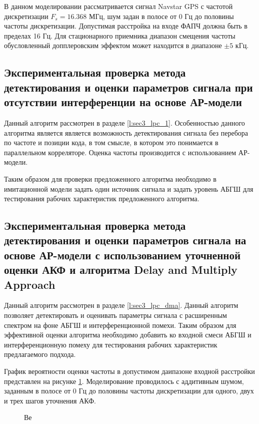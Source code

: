 В данном моделировании рассматривается сигнал Navstar GPS с частотой дискретизации ${F_s=16.368}$ МГц, шум задан в полосе от 0 Гц
до половины частоты дискретизации. Допустимая расстройка на входе ФАПЧ должна быть в пределах 16 Гц. 
Для стационарного приемника диапазон смещения частоты обусловленный допплеровским эффектом \cite{tsui} может находится в диапазоне ${\pm 5}$ кГц.

\subsection{Экспериментальная проверка метода детектирования и оценки параметров сигнала при отсутствии интерференции на основе АР-модели}

Данный алгоритм рассмотрен в разделе \ref{l:sec3_lpc_1}. Особенностью данного алгоритма является является возможность детектирования сигнала
без перебора по частоте и позиции кода, в том смысле, в котором это понимается в параллельном корреляторе. Оценка частоты производится с
использованием АР-модели.

Таким образом для проверки предложенного алгоритма необходимо в имитационной модели задать один источник сигнала и задать уровень АБГШ для
тестирования рабочих характеристик предложенного алгоритма.

\subsection{Экспериментальная проверка метода детектирования и оценки параметров сигнала на основе АР-модели с использованием уточненной оценки АКФ
	и алгоритма Delay and Multiply Approach}

Данный алгоритм рассмотрен в разделе \ref{l:sec3_lpc_dma}. Данный алгоритм позволяет детектировать и оценивать параметры сигнала с расширенным спектром
на фоне АБГШ и интерференционной помехи. Таким образом для эффективной оценки алгоритма необходимо добавить ко входной смеси АБГШ и интерференционную помеху
для тестирования рабочих характеристик предлагаемого подхода.

График вероятности оценки частоты в допустимом даипазоне входной расстройки представлен на рисунке
\ref{pic:ar_dma_probability}. Моделирование проводилось с аддитивным шумом, заданным в полосе от 0 Гц до
половины частоты дискретизации для одного, двух и трех шагов уточнения АКФ.

\begin{figure}[H]
\center{}
	\caption{Ве}
	\label{pic:ar_dma_probability}
\end{figure}

